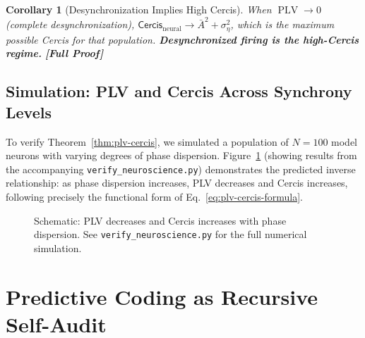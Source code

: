 \documentclass[12pt,a4paper]{article}
\newtheorem{corollary}[theorem]{Corollary}
\theoremstyle{remark}
\newcommand{\Cercis}{\textsf{Cercis}}
\DeclareMathOperator{\PLV}{PLV}
\newcommand{\rigorFull}{\textbf{[Full Proof]}}
\begin{document}
\begin{corollary}[Desynchronization Implies High Cercis]\label{cor:desync-cercis}
When $\PLV \to 0$ (complete desynchronization), $\Cercis_{\text{neural}} \to
\bar{A}^2 + \sigma_\eta^2$, which is the maximum possible \Cercis{} for that
population. \textbf{Desynchronized firing is the high-\Cercis{} regime.}
\rigorFull
\end{corollary}

\subsection{Simulation: PLV and Cercis Across Synchrony Levels}

To verify Theorem~\ref{thm:plv-cercis}, we simulated a population of $N = 100$
model neurons with varying degrees of phase dispersion. Figure~\ref{fig:plv-cercis-sim}
(showing results from the accompanying \texttt{verify\_neuroscience.py})
demonstrates the predicted inverse relationship: as phase dispersion increases,
PLV decreases and \Cercis{} increases, following precisely the functional form
of Eq.~\eqref{eq:plv-cercis-formula}.

\begin{figure}[H]
\centering
{}
\caption{Schematic: PLV decreases and Cercis increases with phase dispersion.
See \texttt{verify\_neuroscience.py} for the full numerical simulation.}
\label{fig:plv-cercis-sim}
\end{figure}

\section{Predictive Coding as Recursive Self-Audit}
\label{sec:predictive-coding}
\end{document}
